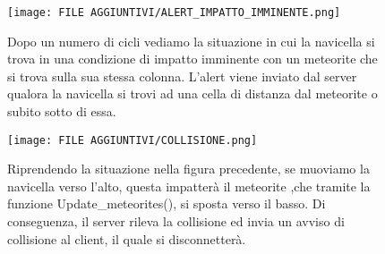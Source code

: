 \documentclass{article}
\begin{document}
\begin{figure}[!htb]
    \centering
    \texttt{[image: FILE AGGIUNTIVI/ALERT\_IMPATTO\_IMMINENTE.png]}
    \raggedright\par
    Dopo un numero di cicli vediamo la situazione in cui la navicella si trova in una condizione di impatto imminente con un meteorite che si trova sulla sua stessa colonna. \newline
    L'alert viene inviato dal server qualora la navicella si trovi ad una cella di distanza dal meteorite o subito sotto di essa.
\end{figure}

\begin{figure}[!htb]
    \centering
    \texttt{[image: FILE AGGIUNTIVI/COLLISIONE.png]}
    \raggedright\par
    Riprendendo la situazione nella figura precedente, se muoviamo la navicella verso l'alto, questa impatterà il meteorite ,che tramite la funzione Update\_meteorites(), si sposta verso il basso. Di conseguenza, il server rileva la collisione ed invia un avviso di collisione al client, il quale si disconnetterà.
\end{figure}
\end{document}
